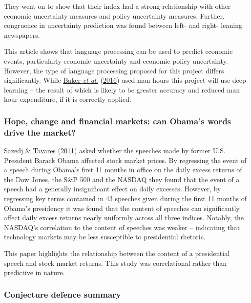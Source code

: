 \documentclass[11pt,preprint, authoryear]{elsarticle}
\numberwithin{equation}{section}
\numberwithin{figure}{section}
\numberwithin{table}{section}
\begin{document}
They went on to show that their index had a strong relationship with
other economic uncertainty measures and policy uncertainty measures.
Further, congruence in uncertainty prediction was found between left-
and right- leaning newspapers.

This article shows that language processing can be used to predict
economic events, particularly economic uncertainty and economic policy
uncertainty. However, the type of language processing proposed for this
project differs significantly. While
\protect\hyperlink{ref-baker2016measuring}{Baker \emph{et al.}}
(\protect\hyperlink{ref-baker2016measuring}{2016}) used man hours this
project will use deep learning -- the result of which is likely to be
greater accuracy and reduced man hour expenditure, if it is correctly
applied.

\hypertarget{hope-change-and-financial-markets-can-obamas-words-drive-the-market}{%
\subsubsection{Hope, change and financial markets: can Obama's words
drive the
market?}\label{hope-change-and-financial-markets-can-obamas-words-drive-the-market}}

\protect\hyperlink{ref-sazedj2011hope}{Sazedj \& Tavares}
(\protect\hyperlink{ref-sazedj2011hope}{2011}) asked whether the
speeches made by former U.S. President Barack Obama affected stock
market prices. By regressing the event of a speech during Obama's first
11 months in office on the daily excess returns of the Dow Jones, the
S\&P 500 and the NASDAQ they found that the event of a speech had a
generally insignificant effect on daily excesses. However, by regressing
key terms contained in 43 speeches given during the first 11 months of
Obama's presidency it was found that the content of speeches can
significantly affect daily excess returns nearly uniformly across all
three indices. Notably, the NASDAQ's correlation to the content of
speeches was weaker -- indicating that technology markets may be less
susceptible to presidential rhetoric.

This paper highlights the relationship between the content of a
presidential speech and stock market returns. This study was
correlational rather than predictive in nature.

\hypertarget{conjecture-defence-summary}{%
\subsubsection{Conjecture defence
summary}\label{conjecture-defence-summary}}
\end{document}
